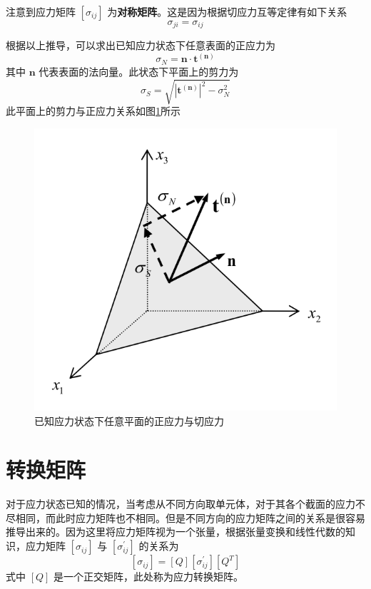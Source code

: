 \documentclass[12pt, a4paper]{ctexart}
\begin{document}
注意到应力矩阵 $ \left[\sigma_{i j}\right] $ 为\textbf{对称矩阵}。这是因为根据切应力互等定律有如下关系
\begin{equation}
\sigma_{j i} = \sigma_{i j} 
\end{equation}

根据以上推导，可以求出已知应力状态下任意表面的正应力为
\begin{equation}
\sigma_{N}=\mathbf{n} \cdot \mathbf{t}^{(\mathbf{n})}
\end{equation}
其中 $ \mathbf{n} $ 代表表面的法向量。此状态下平面上的剪力为
\begin{equation}
\sigma_{S}=\sqrt{\left|\mathbf{t}^{(\mathbf{n})}\right|^{2}-\sigma_{N}^{2}}
\end{equation}
此平面上的剪力与正应力关系如图\ref{fig25}所示

\begin{figure}
	\centering
	\includegraphics[scale=0.8]{25.png}
	\caption{已知应力状态下任意平面的正应力与切应力}
	\label{fig25}
\end{figure}


\section{转换矩阵}

对于应力状态已知的情况，当考虑从不同方向取单元体，对于其各个截面的应力不尽相同，而此时应力矩阵也不相同。但是不同方向的应力矩阵之间的关系是很容易推导出来的。因为这里将应力矩阵视为一个张量，根据张量变换和线性代数的知识，应力矩阵 $  \left[\sigma_{i j}\right]  $
与 $  \left[\sigma_{i j}^{\prime}\right]  $ 的关系为
\begin{equation}
\left[\sigma_{i j}\right] = \left[Q\right]  \left[\sigma_{i j}^{\prime}\right] \left[Q^T\right]
\end{equation}
式中 $ \left[Q\right]  $ 是一个正交矩阵，此处称为应力转换矩阵。
\end{document}

